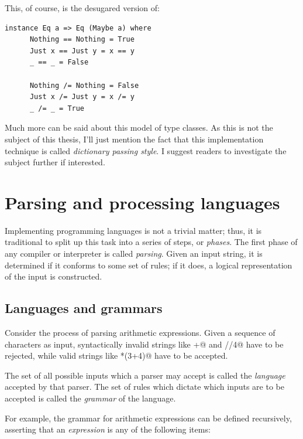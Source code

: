 \documentclass[UdineBachThesis,american,11pt,draft]{PhdThesis}
\begin{document}
  This, of course, is the desugared version of:

  \begin{lstlisting}[gobble=4,basicstyle=\ttfamily\small]
    instance Eq a => Eq (Maybe a) where
      Nothing == Nothing = True
      Just x == Just y = x == y
      _ == _ = False

      Nothing /= Nothing = False
      Just x /= Just y = x /= y
      _ /= _ = True
  \end{lstlisting}

  Much more can be said about this model of type classes. As this is not the
  subject of this thesis, I'll just mention the fact that this implementation
  technique is called \emph{dictionary passing style}. I suggest readers to
  investigate the subject further if interested.

  \chapter{Parsing and processing languages}

  Implementing programming languages is not a trivial matter; thus, it is
  traditional to split up this task into a series of steps, or \emph{phases}.
  The first phase of any compiler or interpreter is called \emph{parsing}. Given
  an input string, it is determined if it conforms to some set of rules; if it
  does, a logical representation of the input is constructed.

  \section{Languages and grammars}

  Consider the process of parsing arithmetic expressions. Given a sequence of
  characters as input, syntactically invalid strings like +@ and
  //4@ have to be rejected, while valid strings like
  *(3+4)@ have to be accepted.

  The set of all possible inputs which a parser may accept is called the
  \emph{language} accepted by that parser. The set of rules which dictate which
  inputs are to be accepted is called the \emph{grammar} of the language.

  For example, the grammar for arithmetic expressions can be defined
  recursively, asserting that an \emph{expression} is any of the following
  items:
\end{document}
